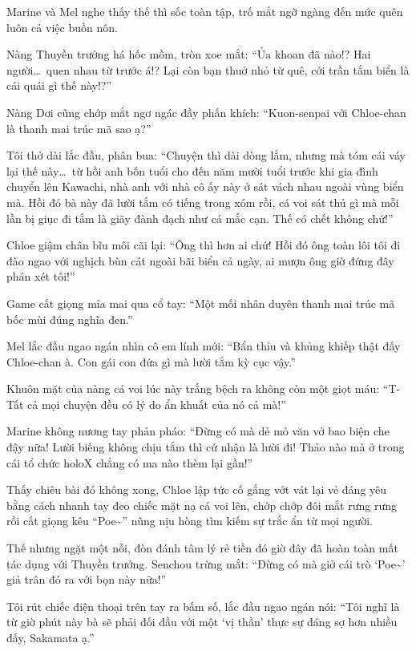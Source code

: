 \documentclass[../main.tex]{subfiles}
\begin{document}
Marine và Mel nghe thấy thế thì sốc toàn tập, trố mắt ngỡ ngàng đến mức quên luôn cả việc buồn nôn.

Nàng Thuyền trưởng há hốc mồm, tròn xoe mắt: ``Ủa khoan đã nào!? Hai người\dots\ quen nhau từ trước á!? Lại còn bạn thuở nhỏ từ quê, cởi trần tắm biển là cái quái gì thế này!?''

Nàng Dơi cũng chớp mắt ngơ ngác đầy phấn khích: ``Kuon-senpai với Chloe-chan là thanh mai trúc mã sao ạ?''

Tôi thở dài lắc đầu, phân bua: ``Chuyện thì dài dòng lắm, nhưng mà tóm cái váy lại thế này\dots\ từ hồi anh bốn tuổi cho đến năm mười tuổi trước khi gia đình chuyển lên Kawachi, nhà anh với nhà cô ấy này ở sát vách nhau ngoài vùng biển mà. Hồi đó bà này đã lười tắm có tiếng trong xóm rồi, cá voi sát thủ gì mà mỗi lần bị giục đi tắm là giãy đành đạch như cá mắc cạn. Thế có chết không chứ!''

Chloe giậm chân bĩu môi cãi lại: ``Ông thì hơn ai chứ! Hồi đó ông toàn lôi tôi đi đào ngao với nghịch bùn cát ngoài bãi biển cả ngày, ai mượn ông giờ đứng đây phán xét tôi!''

Game cất giọng mỉa mai qua cổ tay: ``Một mối nhân duyên thanh mai trúc mã bốc mùi đúng nghĩa đen.''

Mel lắc đầu ngao ngán nhìn cô em lính mới: ``Bẩn thỉu và khủng khiếp thật đấy Chloe-chan à. Con gái con đứa gì mà lười tắm kỳ cục vậy.''

Khuôn mặt của nàng cá voi lúc này trắng bệch ra không còn một giọt máu: ``T-Tất cả mọi chuyện đều có lý do ẩn khuất của nó cả mà!''

Marine không nương tay phản pháo: ``Đừng có mà dẻ mỏ văn vở bao biện che đậy nữa! Lười biếng không chịu tắm thì cứ nhận là lười đi! Thảo nào mà ở trong cái tổ chức holoX chẳng có ma nào thèm lại gần!''

Thấy chiêu bài đó không xong, Chloe lập tức cố gắng vớt vát lại vẻ đáng yêu bằng cách nhanh tay đeo chiếc mặt nạ cá voi lên, chớp chớp đôi mắt rưng rưng rồi cất giọng kêu ``Poe\~{}'' nũng nịu hòng tìm kiếm sự trắc ẩn từ mọi người.

Thế nhưng ngặt một nỗi, đòn đánh tâm lý rẻ tiền đó giờ đây đã hoàn toàn mất tác dụng với Thuyền trưởng. Senchou trừng mắt: ``Đừng có mà giở cái trò `Poe\~{}' giả trân đó ra với bọn này nữa!''

Tôi rút chiếc điện thoại trên tay ra bấm số, lắc đầu ngao ngán nói: ``Tôi nghĩ là từ giờ phút này bà sẽ phải đối đầu với một `vị thần' thực sự đáng sợ hơn nhiều đấy, Sakamata ạ.''
\end{document}
